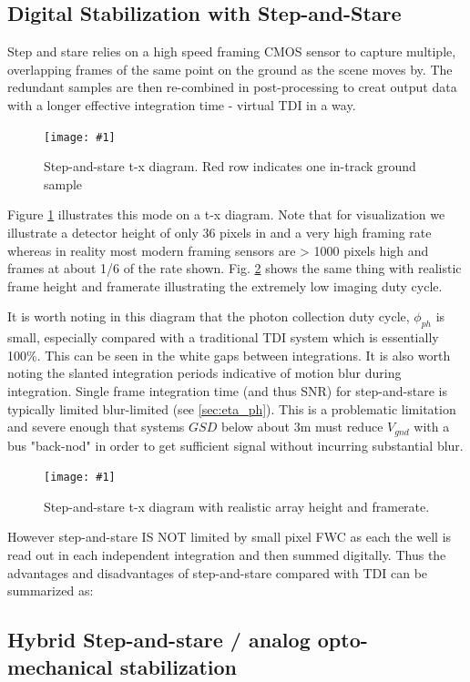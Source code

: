 \documentclass[10pt,journal]{IEEEtran}  %
\newcommand{\includefigure}[3]
{
  \begin{figure}[h!]
  \centering
  \texttt{[image: \#1]}
  \caption[]{#3}
  \label{#2}
  \end{figure}
}
\begin{document}
\subsection{Digital Stabilization with Step-and-Stare}
Step and stare relies on a high speed framing CMOS sensor to capture multiple, overlapping frames of the same point on the ground as the scene moves by.  The redundant samples are then re-combined in post-processing to creat output data with a longer effective integration time - virtual TDI in a way.

\includefigure{figures/step_stare.pgf}{fig:step_stare}{Step-and-stare t-x diagram.  Red row indicates one in-track ground sample}

Figure \ref{fig:step_stare} illustrates this mode on a t-x diagram.  Note that for visualization we illustrate a detector height of only 36 pixels in and a very high framing rate whereas in reality most modern framing sensors are > 1000 pixels high and frames at about 1/6 of the rate shown.  Fig. \ref{fig:step_stare_real} shows the same thing with realistic frame height and framerate illustrating the extremely low imaging duty cycle.

It is worth noting in this diagram that the photon collection duty cycle, $\phi_{ph}$ is small, especially compared with a traditional TDI system which is essentially 100\%.  This can be seen in the white gaps between integrations.  It is also worth noting the slanted integration periods indicative of motion blur during integration.  Single frame integration time (and thus SNR) for step-and-stare is typically limited blur-limited (see \ref{sec:eta_ph}).  This is a problematic limitation and severe enough that systems $GSD$ below about 3m must reduce $V_{gnd}$ with a bus "back-nod" in order to get sufficient signal without incurring substantial blur.

\includefigure{figures/step_stare_real.pgf}{fig:step_stare_real}{Step-and-stare t-x diagram with realistic array height and framerate.}

However step-and-stare IS NOT limited by small pixel FWC as each the well is read out in each independent integration and then summed digitally.  Thus the advantages and disadvantages of step-and-stare compared with TDI can be summarized as:


\subsection{Hybrid Step-and-stare / analog opto-mechanical stabilization}
\end{document}
